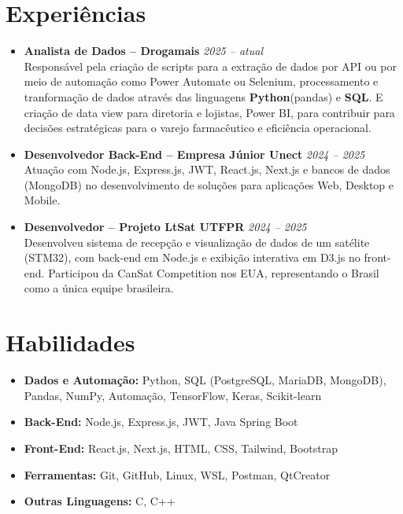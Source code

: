 \documentclass[a4paper,10pt]{article}
\begin{document}
\section*{Experiências}
\begin{itemize}[leftmargin=*]
    \item \textbf{Analista de Dados – Drogamais} \hfill \textit{2025 – atual}\\
    Responsável pela criação de scripts para a extração de dados por API ou por meio de automação como Power Automate ou Selenium, processamento e tranformação de dados através das linguagens \textbf{Python}(pandas) e \textbf{SQL}. E criação de data view para diretoria e lojistas, Power BI, para contribuir para decisões estratégicas para o varejo farmacêutico e eficiência operacional.

    \item \textbf{Desenvolvedor Back-End – Empresa Júnior Unect} \hfill \textit{2024 – 2025}\\
    Atuação com Node.js, Express.js, JWT, React.js, Next.js e bancos de dados (MongoDB) no desenvolvimento de soluções para aplicações Web, Desktop e Mobile.

    \item \textbf{Desenvolvedor – Projeto LtSat UTFPR} \hfill \textit{2024 – 2025}\\
    Desenvolveu sistema de recepção e visualização de dados de um satélite (STM32), com back-end em Node.js e exibição interativa em D3.js no front-end. Participou da CanSat Competition nos EUA, representando o Brasil como a única equipe brasileira.
\end{itemize}

\section*{Habilidades}
\begin{itemize}[leftmargin=*]
    \item \textbf{Dados e Automação:} Python, SQL (PostgreSQL, MariaDB, MongoDB), Pandas, NumPy, Automação, TensorFlow, Keras, Scikit-learn
    \item \textbf{Back-End:} Node.js, Express.js, JWT, Java Spring Boot
    \item \textbf{Front-End:} React.js, Next.js, HTML, CSS, Tailwind, Bootstrap
    \item \textbf{Ferramentas:} Git, GitHub, Linux, WSL, Postman, QtCreator
    \item \textbf{Outras Linguagens:} C, C++
\end{itemize}
\end{document}
